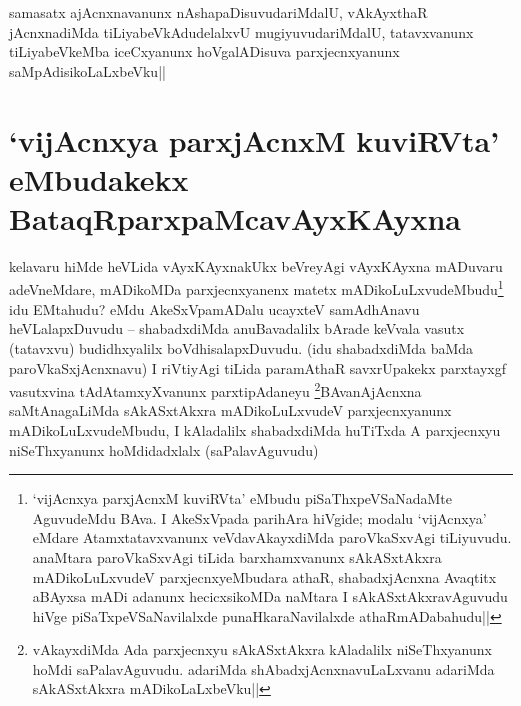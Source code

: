 
\begin{artha} 
samasatx ajAcnxnavanunx nAshapaDisuvudariMdalU, vAkAyxthaR 
jAcnxnadiMda tiLiyabeVkAdudelalxvU mugiyuvudariMdalU, tatavxvanunx 
tiLiyabeVkeMba iceCxyanunx hoVgalADisuva parxjecnxyanunx 
saMpAdisikoLaLxbeVku||
\end{artha}


\section*{`vijAcnxya parxjAcnxM kuviRVta' eMbudakekx 
BataqRparxpaMcavAyxKAyxna}

\begin{artha} 
kelavaru hiMde heVLida vAyxKAyxnakUkx beVreyAgi vAyxKAyxna mADuvaru 
adeVneMdare, mADikoMDa parxjecnxyanenx matetx 
mADikoLuLxvudeMbudu\footnote[1]{`vijAcnxya parxjAcnxM kuviRVta' eMbudu 
piSaThxpeVSaNadaMte AguvudeMdu BAva. I AkeSxVpada parihAra hiVgide; 
modalu `vijAcnxya' eMdare Atamxtatavxvanunx veVdavAkayxdiMda 
paroVkaSxvAgi tiLiyuvudu. anaMtara paroVkaSxvAgi tiLida barxhamxvanunx 
sAkASxtAkxra mADikoLuLxvudeV parxjecnxyeMbudara athaR, shabadxjAcnxna 
Avaqtitx aBAyxsa mADi adanunx hecicxsikoMDa naMtara I 
sAkASxtAkxravAguvudu hiVge piSaTxpeVSaNavilalxde punaHkaraNavilalxde 
athaRmADabahudu||} idu EMtahudu? eMdu AkeSxVpamADalu 
ucayxteV samAdhAnavu heVLalapxDuvudu -- shabadxdiMda anuBavadalilx 
bArade keVvala vasutx (tatavxvu) budidhxyalilx boVdhisalapxDuvudu. 
(idu shabadxdiMda baMda paroVkaSxjAcnxnavu) I riVtiyAgi tiLida 
paramAthaR savxrUpakekx parxtayxgf vasutxvina tAdAtamxyXvanunx 
parxtipAdaneyu \footnote[2]{vAkayxdiMda Ada parxjecnxyu sAkASxtAkxra 
kAladalilx niSeThxyanunx hoMdi saPalavAguvudu. adariMda 
shAbadxjAcnxnavuLaLxvanu adariMda sAkASxtAkxra mADikoLaLxbeVku||}BAvanAjAcnxna saMtAnagaLiMda sAkASxtAkxra 
mADikoLuLxvudeV parxjecnxyanunx mADikoLuLxvudeMbudu, I kAladalilx 
shabadxdiMda huTiTxda A parxjecnxyu niSeThxyanunx hoMdidadxlalx 
(saPalavAguvudu) 
\end{artha}

